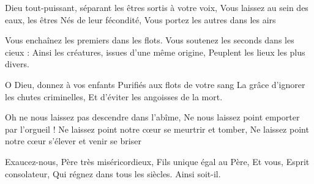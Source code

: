 Dieu tout-puissant, séparant les êtres sortis à votre voix,
Vous laissez au sein des eaux, les êtres
Nés de leur fécondité,
Vous portez les autres dans les airs

Vous enchaînez les premiers dans les flots.
Vous soutenez les seconds dans les cieux :
Ainsi les créatures, issues d'une même origine,
Peuplent les lieux les plus divers.

O Dieu, donnez à vos enfants
Purifiés aux flots de votre sang
La grâce d'ignorer les chutes criminelles,
Et d'éviter les angoisses de la mort.

Oh ne nous laissez pas descendre dans l'abîme,
Ne nous laissez point emporter par l'orgueil !
Ne laissez point notre cœur se meurtrir et tomber,
Ne laissez point notre cœur s'élever et venir se briser

Exaucez-nous, Père très miséricordieux,
Fils unique égal au Père,
Et vous, Esprit consolateur,
Qui régnez dans tous les siècles.
Ainsi soit-il.